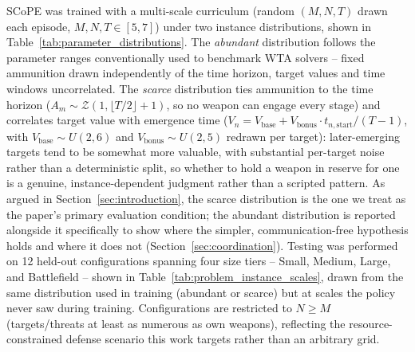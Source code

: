 SCoPE was trained with a multi-scale curriculum (random $(M,N,T)$ drawn each episode, $M,N,T \in [5,7]$) under two instance distributions, shown in Table~\ref{tab:parameter_distributions}. The \emph{abundant} distribution follows the parameter ranges conventionally used to benchmark WTA solvers -- fixed ammunition drawn independently of the time horizon, target values and time windows uncorrelated. The \emph{scarce} distribution ties ammunition to the time horizon ($A_m \sim \mathcal{Z}(1, \lfloor T/2\rfloor+1)$, so no weapon can engage every stage) and correlates target value with emergence time ($V_n = V_{\text{base}} + V_{\text{bonus}}\cdot t_{n,\text{start}}/(T{-}1)$, with $V_{\text{base}}\sim U(2,6)$ and $V_{\text{bonus}}\sim U(2,5)$ redrawn per target): later-emerging targets tend to be somewhat more valuable, with substantial per-target noise rather than a deterministic split, so whether to hold a weapon in reserve for one is a genuine, instance-dependent judgment rather than a scripted pattern. As argued in Section~\ref{sec:introduction}, the scarce distribution is the one we treat as the paper's primary evaluation condition; the abundant distribution is reported alongside it specifically to show where the simpler, communication-free hypothesis holds and where it does not (Section~\ref{sec:coordination}). Testing was performed on 12 held-out configurations spanning four size tiers -- Small, Medium, Large, and Battlefield -- shown in Table~\ref{tab:problem_instance_scales}, drawn from the same distribution used in training (abundant or scarce) but at scales the policy never saw during training. Configurations are restricted to $N \geq M$ (targets/threats at least as numerous as own weapons), reflecting the resource-constrained defense scenario this work targets rather than an arbitrary grid.



